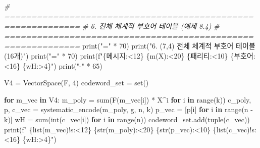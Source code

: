 \documentclass[
  oneside]{article}
\newenvironment{Shaded}{}{}
\newcommand{\BuiltInTok}[1]{\textcolor[rgb]{0.00,0.50,0.00}{#1}}
\newcommand{\CommentTok}[1]{\textcolor[rgb]{0.38,0.63,0.69}{\textit{#1}}}
\newcommand{\ControlFlowTok}[1]{\textcolor[rgb]{0.00,0.44,0.13}{\textbf{#1}}}
\newcommand{\DecValTok}[1]{\textcolor[rgb]{0.25,0.63,0.44}{#1}}
\newcommand{\KeywordTok}[1]{\textcolor[rgb]{0.00,0.44,0.13}{\textbf{#1}}}
\newcommand{\NormalTok}[1]{#1}
\newcommand{\OperatorTok}[1]{\textcolor[rgb]{0.40,0.40,0.40}{#1}}
\newcommand{\SpecialCharTok}[1]{\textcolor[rgb]{0.25,0.44,0.63}{#1}}
\newcommand{\SpecialStringTok}[1]{\textcolor[rgb]{0.73,0.40,0.53}{#1}}
\newcommand{\StringTok}[1]{\textcolor[rgb]{0.25,0.44,0.63}{#1}}
\begin{document}
\begin{Shaded}
\begin{Highlighting}[]
\CommentTok{\# ============================================================}
\CommentTok{\# 6. 전체 체계적 부호어 테이블 (예제 8.4)}
\CommentTok{\# ============================================================}
\BuiltInTok{print}\NormalTok{(}\StringTok{"="} \OperatorTok{*} \DecValTok{70}\NormalTok{)}
\BuiltInTok{print}\NormalTok{(}\StringTok{"6. (7,4) 전체 체계적 부호어 테이블 (16개)"}\NormalTok{)}
\BuiltInTok{print}\NormalTok{(}\StringTok{"="} \OperatorTok{*} \DecValTok{70}\NormalTok{)}
\BuiltInTok{print}\NormalTok{(}\SpecialStringTok{f"}\SpecialCharTok{\{}\StringTok{\textquotesingle{}메시지\textquotesingle{}}\SpecialCharTok{:\textless{}12\}}\SpecialStringTok{ }\SpecialCharTok{\{}\StringTok{\textquotesingle{}m(X)\textquotesingle{}}\SpecialCharTok{:\textless{}20\}}\SpecialStringTok{ }\SpecialCharTok{\{}\StringTok{\textquotesingle{}패리티\textquotesingle{}}\SpecialCharTok{:\textless{}10\}}\SpecialStringTok{ }\SpecialCharTok{\{}\StringTok{\textquotesingle{}부호어\textquotesingle{}}\SpecialCharTok{:\textless{}16\}}\SpecialStringTok{ }\SpecialCharTok{\{}\StringTok{\textquotesingle{}wH\textquotesingle{}}\SpecialCharTok{:\textgreater{}4\}}\SpecialStringTok{"}\NormalTok{)}
\BuiltInTok{print}\NormalTok{(}\StringTok{"{-}"} \OperatorTok{*} \DecValTok{65}\NormalTok{)}

\NormalTok{V4 }\OperatorTok{=}\NormalTok{ VectorSpace(F, }\DecValTok{4}\NormalTok{)}
\NormalTok{codeword\_set }\OperatorTok{=} \BuiltInTok{set}\NormalTok{()}

\ControlFlowTok{for}\NormalTok{ m\_vec }\KeywordTok{in}\NormalTok{ V4:}
\NormalTok{    m\_poly }\OperatorTok{=} \BuiltInTok{sum}\NormalTok{(F(m\_vec[i]) }\OperatorTok{*}\NormalTok{ X}\OperatorTok{\^{}}\NormalTok{i }\ControlFlowTok{for}\NormalTok{ i }\KeywordTok{in} \BuiltInTok{range}\NormalTok{(k))}
\NormalTok{    c\_poly, p, c\_vec }\OperatorTok{=}\NormalTok{ systematic\_encode(m\_poly, g, n, k)}
\NormalTok{    p\_vec }\OperatorTok{=}\NormalTok{ [p[i] }\ControlFlowTok{for}\NormalTok{ i }\KeywordTok{in} \BuiltInTok{range}\NormalTok{(n }\OperatorTok{{-}}\NormalTok{ k)]}
\NormalTok{    wH }\OperatorTok{=} \BuiltInTok{sum}\NormalTok{(}\BuiltInTok{int}\NormalTok{(c\_vec[i]) }\ControlFlowTok{for}\NormalTok{ i }\KeywordTok{in} \BuiltInTok{range}\NormalTok{(n))}
\NormalTok{    codeword\_set.add(}\BuiltInTok{tuple}\NormalTok{(c\_vec))}
    \BuiltInTok{print}\NormalTok{(}\SpecialStringTok{f"  }\SpecialCharTok{\{}\BuiltInTok{list}\NormalTok{(m\_vec)}\SpecialCharTok{!s:\textless{}12\}}\SpecialStringTok{ }\SpecialCharTok{\{}\BuiltInTok{str}\NormalTok{(m\_poly)}\SpecialCharTok{:\textless{}20\}}\SpecialStringTok{ }\SpecialCharTok{\{}\BuiltInTok{str}\NormalTok{(p\_vec)}\SpecialCharTok{:\textless{}10\}}\SpecialStringTok{ }\SpecialCharTok{\{}\BuiltInTok{list}\NormalTok{(c\_vec)}\SpecialCharTok{!s:\textless{}16\}}\SpecialStringTok{ }\SpecialCharTok{\{}\NormalTok{wH}\SpecialCharTok{:\textgreater{}4\}}\SpecialStringTok{"}\NormalTok{)}


\end{Highlighting}
\end{Shaded}
\end{document}
